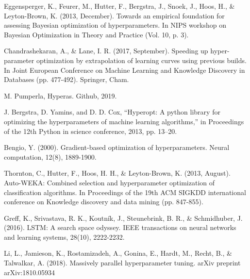 \documentclass[conference]{IEEEtran}
\begin{document}
\begin{thebibliography}{}
Eggensperger, K., Feurer, M., Hutter, F., Bergstra, J., Snoek, J., Hoos, H., \& Leyton-Brown, K. (2013, December). Towards an empirical foundation for assessing Bayesian optimization of hyperparameters. In NIPS workshop on Bayesian Optimization in Theory and Practice (Vol. 10, p. 3).

Chandrashekaran, A., \& Lane, I. R. (2017, September). Speeding up hyper-parameter optimization by extrapolation of learning curves using previous builds. In Joint European Conference on Machine Learning and Knowledge Discovery in Databases (pp. 477-492). Springer, Cham.

M. Pumperla, Hyperas. Github, 2019.

J. Bergstra, D. Yamins, and D. D. Cox, “Hyperopt: A python library for optimizing the hyperparameters of machine learning algorithms,” in Proceedings of the 12th Python in science conference, 2013, pp. 13–20.

Bengio, Y. (2000). Gradient-based optimization of hyperparameters. Neural computation, 12(8), 1889-1900.

Thornton, C., Hutter, F., Hoos, H. H., \& Leyton-Brown, K. (2013, August). Auto-WEKA: Combined selection and hyperparameter optimization of classification algorithms. In Proceedings of the 19th ACM SIGKDD international conference on Knowledge discovery and data mining (pp. 847-855).

Greff, K., Srivastava, R. K., Koutník, J., Steunebrink, B. R., \& Schmidhuber, J. (2016). LSTM: A search space odyssey. IEEE transactions on neural networks and learning systems, 28(10), 2222-2232.

Li, L., Jamieson, K., Rostamizadeh, A., Gonina, E., Hardt, M., Recht, B., \& Talwalkar, A. (2018). Massively parallel hyperparameter tuning. arXiv preprint arXiv:1810.05934
\end{thebibliography}
\end{document}
